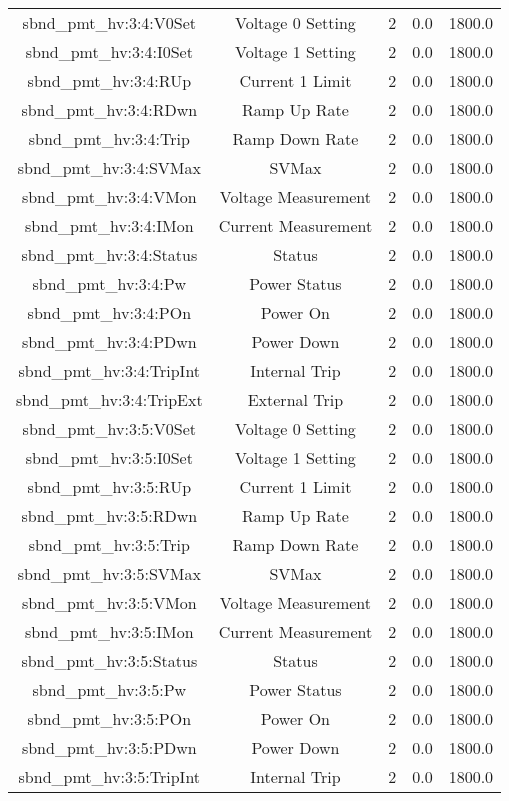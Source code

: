 \begin{table}[ptb]
\begin{tabular}{c | c c c c}
sbnd_pmt_hv:3:4:V0Set & Voltage 0 Setting & 2 & 0.0 & 1800.0\\ 
sbnd_pmt_hv:3:4:I0Set & Voltage 1 Setting & 2 & 0.0 & 1800.0\\ 
sbnd_pmt_hv:3:4:RUp & Current 1 Limit & 2 & 0.0 & 1800.0\\ 
sbnd_pmt_hv:3:4:RDwn & Ramp Up Rate & 2 & 0.0 & 1800.0\\ 
sbnd_pmt_hv:3:4:Trip & Ramp Down Rate & 2 & 0.0 & 1800.0\\ 
sbnd_pmt_hv:3:4:SVMax & SVMax & 2 & 0.0 & 1800.0\\ 
sbnd_pmt_hv:3:4:VMon & Voltage Measurement & 2 & 0.0 & 1800.0\\ 
sbnd_pmt_hv:3:4:IMon & Current Measurement & 2 & 0.0 & 1800.0\\ 
sbnd_pmt_hv:3:4:Status & Status & 2 & 0.0 & 1800.0\\ 
sbnd_pmt_hv:3:4:Pw & Power Status & 2 & 0.0 & 1800.0\\ 
sbnd_pmt_hv:3:4:POn & Power On & 2 & 0.0 & 1800.0\\ 
sbnd_pmt_hv:3:4:PDwn & Power Down & 2 & 0.0 & 1800.0\\ 
sbnd_pmt_hv:3:4:TripInt & Internal Trip & 2 & 0.0 & 1800.0\\ 
sbnd_pmt_hv:3:4:TripExt & External Trip & 2 & 0.0 & 1800.0\\ 
sbnd_pmt_hv:3:5:V0Set & Voltage 0 Setting & 2 & 0.0 & 1800.0\\ 
sbnd_pmt_hv:3:5:I0Set & Voltage 1 Setting & 2 & 0.0 & 1800.0\\ 
sbnd_pmt_hv:3:5:RUp & Current 1 Limit & 2 & 0.0 & 1800.0\\ 
sbnd_pmt_hv:3:5:RDwn & Ramp Up Rate & 2 & 0.0 & 1800.0\\ 
sbnd_pmt_hv:3:5:Trip & Ramp Down Rate & 2 & 0.0 & 1800.0\\ 
sbnd_pmt_hv:3:5:SVMax & SVMax & 2 & 0.0 & 1800.0\\ 
sbnd_pmt_hv:3:5:VMon & Voltage Measurement & 2 & 0.0 & 1800.0\\ 
sbnd_pmt_hv:3:5:IMon & Current Measurement & 2 & 0.0 & 1800.0\\ 
sbnd_pmt_hv:3:5:Status & Status & 2 & 0.0 & 1800.0\\ 
sbnd_pmt_hv:3:5:Pw & Power Status & 2 & 0.0 & 1800.0\\ 
sbnd_pmt_hv:3:5:POn & Power On & 2 & 0.0 & 1800.0\\ 
sbnd_pmt_hv:3:5:PDwn & Power Down & 2 & 0.0 & 1800.0\\ 
sbnd_pmt_hv:3:5:TripInt & Internal Trip & 2 & 0.0 & 1800.0\\ 

\end{tabular}
\end{table}

